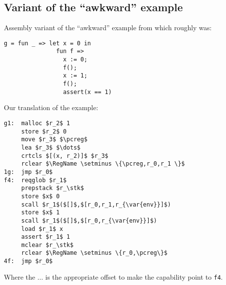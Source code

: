 \documentclass[a4paper]{article}
\newcommand{\var}[1]{\mathit{#1}}
\newcommand{\pcreg}{\mathrm{pc}}
\newcommand{\stk}{\var{stk}}
\newcommand{\plaindom}[1]{\mathrm{#1}}
\newcommand{\RegName}{\plaindom{RegisterName}}
\begin{document}
\subsection{Variant of the ``awkward'' example}
Assembly variant of the ``awkward'' example from \citep[p.~11]{Dreyer:2010:IHS:1863543.1863566} which roughly was:
\begin{verbatim}
g = fun _ => let x = 0 in
               fun f =>
                 x := 0;
                 f();
                 x := 1;
                 f();
                 assert(x == 1)
\end{verbatim}
Our translation of the example:
\begin{lstlisting}
g1:  malloc $r_2$ 1
     store $r_2$ 0
     move $r_3$ $\pcreg$
     lea $r_3$ $\dots$
     crtcls $[(x, r_2)]$ $r_3$
     rclear $\RegName \setminus \{\pcreg,r_0,r_1 \}$
1g:  jmp $r_0$
f4:  reqglob $r_1$
     prepstack $r_\stk$
     store $x$ 0
     scall $r_1$($[]$,$[r_0,r_1,r_{\var{env}}]$)
     store $x$ 1
     scall $r_1$($[]$,$[r_0,r_{\var{env}}]$)
     load $r_1$ x
     assert $r_1$ 1
     mclear $r_\stk$
     rclear $\RegName \setminus \{r_0,\pcreg\}$
4f:  jmp $r_0$
\end{lstlisting}
Where the $\dots$ is the appropriate offset to make the capability point to \texttt{f4}.
\end{document}
